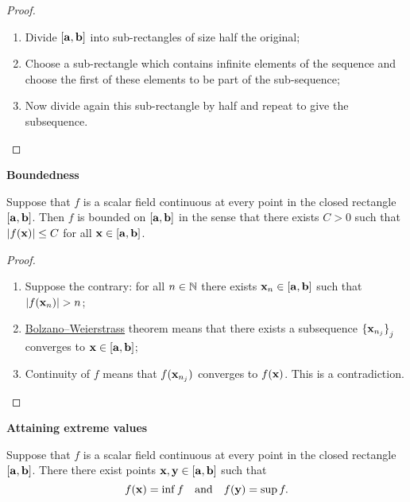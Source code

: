 \begin{proof}
    \begin{enumerate}
        \item Divide \( [\mathbf{a},\mathbf{b}]\) into sub-rectangles of size half the original;
        \item Choose a sub-rectangle which contains infinite elements of the sequence and choose the first of these elements to be part of the sub-sequence;
        \item Now divide again this sub-rectangle by half and repeat to give the subsequence.
    \end{enumerate}
\end{proof}



\textbf{Boundedness}

\begin{theorem}
    Suppose that \(f\) is a scalar field continuous at every point in the closed rectangle \([\mathbf{a},\mathbf{b}]\).
    Then \(f\) is bounded on \([\mathbf{a},\mathbf{b}]\) in the sense that there exists \(C>0\) such that \(\left|f(\mathbf{x})\right| \leq C\) for all \(\mathbf{x} \in [\mathbf{a},\mathbf{b}]\).
\end{theorem}


\begin{proof}
    \begin{enumerate}
        \item Suppose the contrary: for all \(n\in\mathbb{N}\) there exists \(\mathbf{x}_n\in [\mathbf{a},\mathbf{b}]\) such that \(\abs{f(\xx_n)}>n\);
        \item \href{https://en.wikipedia.org/wiki/Bolzano%E2%80%93Weierstrass_theorem}{Bolzano–Weierstrass} theorem means that there exists a subsequence \({\{\mathbf{x}_{n_j}\}}_{j}\) converges to \( \mathbf{x} \in [\mathbf{a},\mathbf{b}]\);
        \item Continuity of \(f\) means that \(f(\mathbf{x}_{n_j})\) converges to \(f(\mathbf{x})\). This is a contradiction.
    \end{enumerate}
\end{proof}




\textbf{Attaining extreme values}

\begin{theorem}
    Suppose that \(f\) is a scalar field continuous at every point in the closed rectangle \([\mathbf{a},\mathbf{b}]\).
    There there exist points \( \mathbf{x}, \mathbf{y} \in [\mathbf{a},\mathbf{b}]\) such that
    \[
        f(\mathbf{x}) = \inf f
        \quad \text{and} \quad
        f(\mathbf{y})= \sup f.
    \]
\end{theorem}

